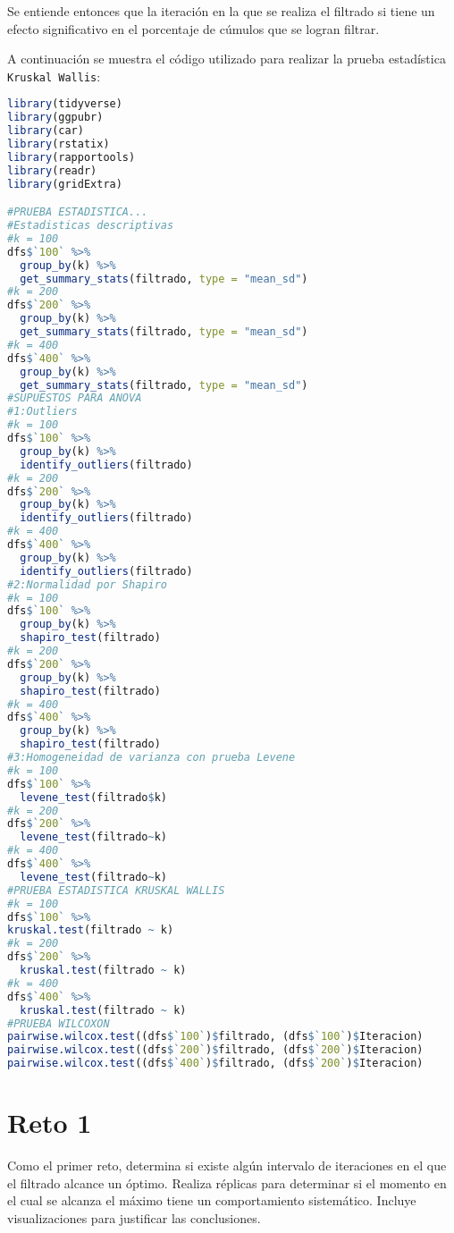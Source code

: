\documentclass{article}
\begin{document}
Se entiende entonces que la iteración en la que se realiza el filtrado si tiene un efecto significativo en el porcentaje de cúmulos que se logran filtrar.
\bigskip

A continuación se muestra el código utilizado para realizar la prueba estadística \texttt{Kruskal Wallis}:

\lstset{style=mystyle}
\begin{lstlisting}[language=R, caption= Código para la prueba estadística \texttt{Kruskal Wallis}.]
library(tidyverse)
library(ggpubr)
library(car)
library(rstatix)
library(rapportools)
library(readr)
library(gridExtra)

#PRUEBA ESTADISTICA...
#Estadisticas descriptivas
#k = 100
dfs$`100` %>%
  group_by(k) %>%
  get_summary_stats(filtrado, type = "mean_sd")
#k = 200
dfs$`200` %>%
  group_by(k) %>%
  get_summary_stats(filtrado, type = "mean_sd")
#k = 400
dfs$`400` %>%
  group_by(k) %>%
  get_summary_stats(filtrado, type = "mean_sd")
#SUPUESTOS PARA ANOVA
#1:Outliers
#k = 100
dfs$`100` %>%
  group_by(k) %>%
  identify_outliers(filtrado)
#k = 200
dfs$`200` %>%
  group_by(k) %>%
  identify_outliers(filtrado)
#k = 400
dfs$`400` %>%
  group_by(k) %>%
  identify_outliers(filtrado)
#2:Normalidad por Shapiro
#k = 100
dfs$`100` %>%
  group_by(k) %>%
  shapiro_test(filtrado)
#k = 200
dfs$`200` %>%
  group_by(k) %>%
  shapiro_test(filtrado)
#k = 400
dfs$`400` %>%
  group_by(k) %>%
  shapiro_test(filtrado)
#3:Homogeneidad de varianza con prueba Levene
#k = 100
dfs$`100` %>%
  levene_test(filtrado$k)
#k = 200
dfs$`200` %>%
  levene_test(filtrado~k)
#k = 400
dfs$`400` %>%
  levene_test(filtrado~k)
#PRUEBA ESTADISTICA KRUSKAL WALLIS
#k = 100
dfs$`100` %>%
kruskal.test(filtrado ~ k)
#k = 200
dfs$`200` %>%
  kruskal.test(filtrado ~ k)
#k = 400
dfs$`400` %>%
  kruskal.test(filtrado ~ k)
#PRUEBA WILCOXON
pairwise.wilcox.test((dfs$`100`)$filtrado, (dfs$`100`)$Iteracion)
pairwise.wilcox.test((dfs$`200`)$filtrado, (dfs$`200`)$Iteracion)
pairwise.wilcox.test((dfs$`400`)$filtrado, (dfs$`200`)$Iteracion)
\end{lstlisting}

\section{Reto 1}
Como el primer reto, determina si existe algún intervalo de iteraciones en el que el filtrado alcance un óptimo. Realiza réplicas para determinar si el momento en el cual se alcanza el máximo tiene un comportamiento sistemático. Incluye visualizaciones para justificar las conclusiones.
\bigskip
\end{document}
